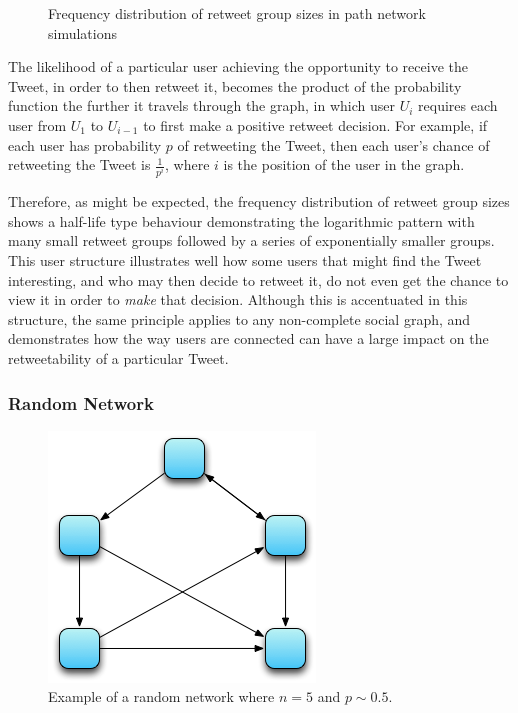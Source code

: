\begin{figure}[h]
\centering
{}
\caption{Frequency distribution of retweet group sizes in path network simulations}
\label{fig:linear}
\end{figure}

The likelihood of a particular user achieving the opportunity to receive the Tweet, in order to then retweet it, becomes the product of the probability function the further it travels through the graph, in which user $U_i$ requires each user from $ U_1$ to $U_{i-1}$ to first make a positive retweet decision. For example, if each user has probability $p$ of retweeting the Tweet, then each user's chance of retweeting the Tweet is $\frac{1}{p^i}$, where $i$ is the position of the user in the graph.

Therefore, as might be expected, the frequency distribution of retweet group sizes shows a half-life type behaviour demonstrating the logarithmic pattern with many small retweet groups followed by a series of exponentially smaller groups.\\
This user structure illustrates well how some users that might find the Tweet interesting, and who may then decide to retweet it, do not even get the chance to view it in order to \textit{make} that decision. Although this is accentuated in this structure, the same principle applies to any non-complete social graph, and demonstrates how the way users are connected can have a large impact on the retweetability of a particular Tweet.


\subsubsection{Random Network}

\begin{figure}[h]
\centering
\includegraphics[scale=0.8]{4.Chapter2/Media/random_network.png} 
\caption{Example of a random network where $n = 5$ and $p \sim 0.5$.}
\label{fig:path_network}
\end{figure}


